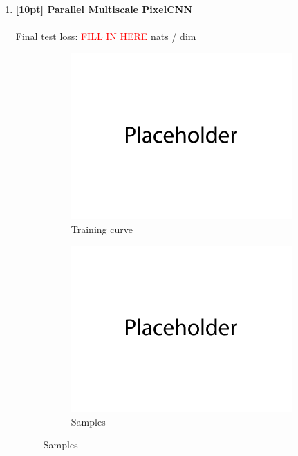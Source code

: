 \documentclass{article}
\begin{document}
\begin{enumerate}
\begin{figure}[H]
\begin{subfigure}{0.45\textwidth}
        \caption{Samples}
    \end{subfigure}
\end{figure}
\newpage
\item {\bf [10pt] Parallel Multiscale PixelCNN} \\\\
Final test loss: \textcolor{red}{FILL IN HERE}  nats / dim
\begin{figure}[H]
    \centering
    \begin{subfigure}{0.45\textwidth}
        \centering
        \includegraphics[width=\textwidth]{figures/q4_c_train_plot.png}
        \caption{Training curve}
    \end{subfigure}
    \hspace{0.2in}
    \begin{subfigure}{0.45\textwidth}
        \centering
        \includegraphics[width=\textwidth]{figures/q4_c_samples.png}
        \caption{Samples}
    \end{subfigure}
\end{figure}
\end{enumerate}
\end{document}
